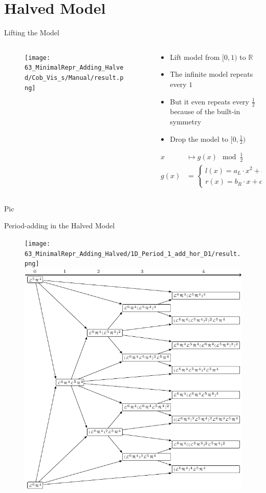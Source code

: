 \section{Halved Model}

\begin{frame}{Lifting the Model}
	\vspace{-1em}
	\begin{columns}
		\begin{column}{.4 \textwidth}
			\begin{figure}
				\texttt{[image: 63\_MinimalRepr\_Adding\_Halved/Cob\_Vis\_s/Manual/result.png]}
			\end{figure}
		\end{column}
		\begin{column}{.5 \textwidth}
			\pause
			\begin{itemize}
				\item Lift model from $[0, 1)$ to $\mathbb{R}$ \pause
				\item The infinite model repeats every $1$ \pause
				\item But it even repeats every $\frac{1}{2}$ because of the built-in symmetry \pause
				\item Drop the model to $[0, \frac{1}{2})$ \pause
			\end{itemize}
			\begin{align*}
				x    & \mapsto g(x) \mod \frac{1}{2}                                            \\
				g(x) & = \begin{cases}
					         l(x) = a_L \cdot x^2 + b_L \cdot x + c_L & \text{ if } x < \frac{1}{4} \\
					         r(x) = b_R \cdot x + c_R                 & \text{ else}
				         \end{cases}
			\end{align*}
		\end{column}
	\end{columns}
\end{frame}

\begin{frame}{Pic}
\end{frame}

\begin{frame}{Period-adding in the Halved Model}
	\begin{figure}
		\texttt{[image: 63\_MinimalRepr\_Adding\_Halved/1D\_Period\_1\_add\_hor\_D1/result.png]}
		\quad
		\includegraphics[width=.4 \textwidth]{../../Report/Figures/FareyTrees/Minrep_Adding1_Halved/adding.pdf}
	\end{figure}
\end{frame}

